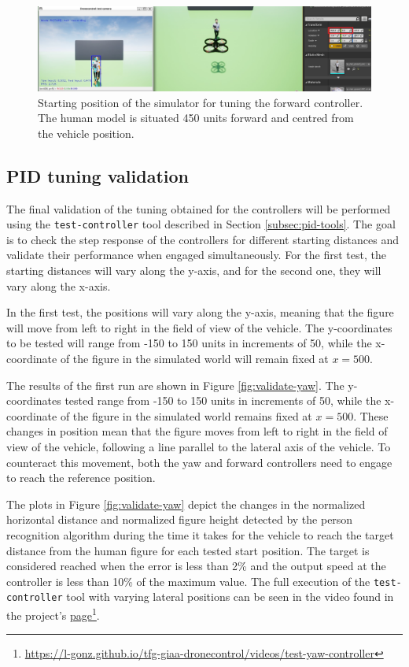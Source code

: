 \begin{figure}[H]
  \centering
  \includegraphics[width=\textwidth, keepaspectratio]{img/pid/tune-ref-pos-fwd.jpg}
  \caption{Starting position of the simulator for tuning the forward controller. The human model is situated 450 units forward and centred from the vehicle position.}\label{fig:tune-ref-pos-fwd}
\end{figure}



\subsection{PID tuning validation}
\label{subsec:pid-test-controller}

The final validation of the tuning obtained for the controllers will be performed using the \texttt{test-controller} tool described in Section \ref{subsec:pid-tools}. The goal is to check the step response of the controllers for different starting distances and validate their performance when engaged simultaneously. For the first test, the starting distances will vary along the y-axis, and for the second one, they will vary along the x-axis.

In the first test, the positions will vary along the y-axis, meaning that the figure will move from left to right in the field of view of the vehicle. The y-coordinates to be tested will range from -150 to 150 units in increments of 50, while the x-coordinate of the figure in the simulated world will remain fixed at $x=500$.

The results of the first run are shown in Figure \ref{fig:validate-yaw}. The y-coordinates tested range from -150 to 150 units in increments of 50, while the x-coordinate of the figure in the simulated world remains fixed at $x=500$. These changes in position mean that the figure moves from left to right in the field of view of the vehicle, following a line parallel to the lateral axis of the vehicle. To counteract this movement, both the yaw and forward controllers need to engage to reach the reference position.

The plots in Figure \ref{fig:validate-yaw} depict the changes in the normalized horizontal distance and normalized figure height detected by the person recognition algorithm during the time it takes for the vehicle to reach the target distance from the human figure for each tested start position. The target is considered reached when the error is less than 2\% and the output speed at the controller is less than 10\% of the maximum value. The full execution of the \texttt{test-controller} tool with varying lateral positions can be seen in the video found in the project's \href{https://l-gonz.github.io/tfg-giaa-dronecontrol/videos/test-yaw-controller}{page}\footnote{\url{https://l-gonz.github.io/tfg-giaa-dronecontrol/videos/test-yaw-controller}}.

